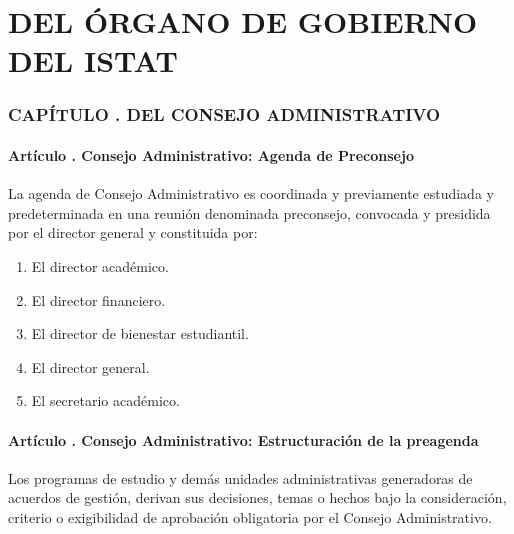 \part{DEL ÓRGANO DE GOBIERNO DEL ISTAT}
\section{CAPÍTULO . DEL CONSEJO ADMINISTRATIVO}
\setcounter{re}{1}

\subsection{Artículo . Consejo Administrativo: Agenda de Preconsejo}
\addtocounter{ns}{1}
La agenda de Consejo Administrativo es coordinada y previamente estudiada y predeterminada en una reunión denominada preconsejo, convocada y presidida por el director general y constituida por:
\begin{enumerate}
\item El director académico. 
\item El director financiero. 
\item El director de bienestar estudiantil. 
\item El director general.  
\item El secretario académico. 

\end{enumerate}
\subsection{Artículo . Consejo Administrativo: Estructuración de la preagenda}
\addtocounter{ns}{1}
Los programas de estudio y demás unidades administrativas generadoras de acuerdos de gestión, derivan sus decisiones, temas o hechos bajo la consideración, criterio o exigibilidad de aprobación obligatoria por el Consejo Administrativo. 

